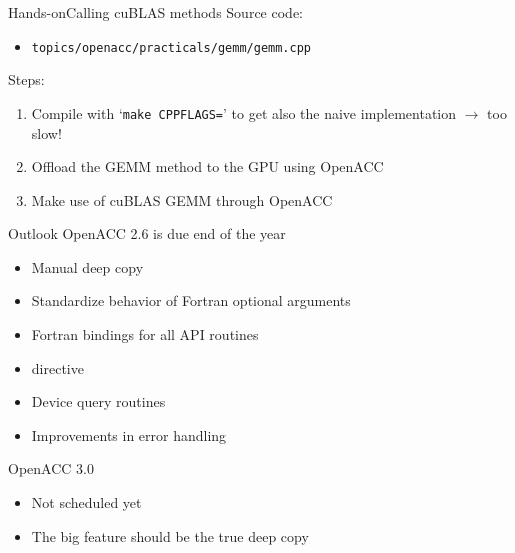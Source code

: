 \documentclass[12pt,aspectratio=169]{beamer}
\newcommand\shinline[2][]{\lstinline[style=shstyle,basicstyle=\ttfamily,#1]!#2!}
\begin{document}
\begin{frame}[fragile]{Hands-on}{Calling cuBLAS methods}
  Source code:
  \begin{itemize}
  \item \shinline{topics/openacc/practicals/gemm/gemm.cpp}
  \end{itemize}
  \vfill
  Steps:
  \begin{enumerate}
  \item Compile with `\shinline{make CPPFLAGS=}' to get also the naive implementation $\rightarrow$ too slow!
  \item Offload the GEMM method to the GPU using OpenACC
  \item Make use of cuBLAS GEMM through OpenACC
  \end{enumerate}
\end{frame}


\begin{frame}[fragile]{Outlook}
  OpenACC 2.6 is due end of the year
  \begin{itemize}
  \item Manual deep copy
  \item Standardize behavior of Fortran optional arguments
  \item Fortran bindings for all API routines
  \item {} directive
  \item Device query routines
  \item Improvements in error handling
  \end{itemize}
  OpenACC 3.0
  \begin{itemize}
  \item Not scheduled yet
  \item The big feature should be the true deep copy
  \end{itemize}
\end{frame}
\end{document}
